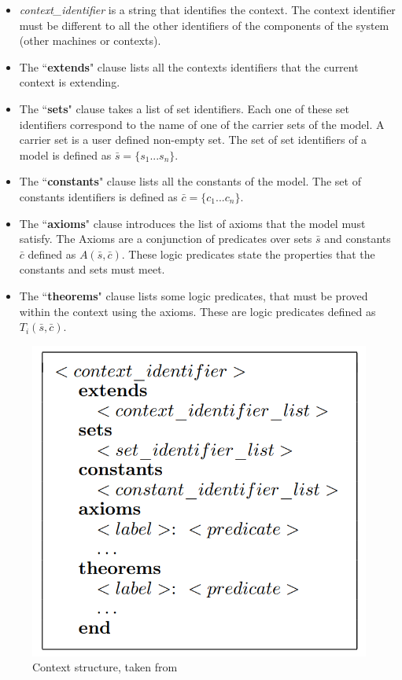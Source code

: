 \begin{itemize}
    \item \textit{context\_identifier} is a string that identifies the context. The context identifier must be different to all the other identifiers of the components of the system (other machines or contexts).
    \item The ``\textbf{extends}" clause lists all the contexts identifiers that the current context is extending.
    \item The ``\textbf{sets}" clause takes a list of set identifiers. Each one of these set identifiers correspond to the name of one of the carrier sets of the model. A carrier set is a user defined  non-empty set. The set of set identifiers of a model is defined as $\bar{s} = \{s_1...s_n\}$. 
    \item The ``\textbf{constants}" clause lists all the constants of the model. The set of constants identifiers is defined as $\bar{c} = \{c_1...c_n\}$.
    \item The ``\textbf{axioms}" clause introduces the list of axioms that the model must satisfy. The Axioms are a conjunction of predicates over sets $\bar{s}$ and constants $\bar{c}$ defined as $A(\bar{s},\bar{c})$. These logic predicates state the properties that the constants and sets must meet.
    \item The ``\textbf{theorems}" clause lists some logic predicates, that must be proved within the context using the axioms. These are logic predicates defined as $T_i(\bar{s},\bar{c})$.
\end{itemize}

\begin{figure}[H]
    \centering
    \includegraphics[scale = 0.5]{images/eventb2.PNG}
    \caption{Context structure, taken from \cite{Abrial2011}}
    \label{fig:eventb2}
\end{figure}

